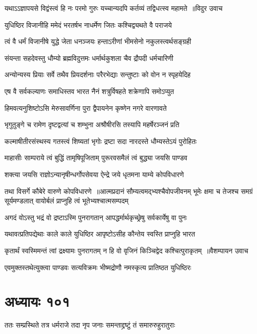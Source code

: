 \twolineshloka
{यथाऽऽज्ञापयसे विद्वंस्त्वं हि नः परमो गुरुः}
{यच्चान्यदपि कर्तव्यं तद्विधत्स्व महामते ॥विदुर उवाच}


\twolineshloka
{युधिष्ठिर विजानीहि ममेदं भरतर्षभ}
{नाधर्मेण जितः कश्चिद्व्यथते वै पराजये}


\twolineshloka
{त्वं वै धर्मं विजानीषे युद्धे जेता धनञ्जयः}
{हन्ताऽरीणां भीमसेनो नकुलस्त्वर्थसङ्ग्रही}


\twolineshloka
{संयन्ता सहदेवस्तु धौम्यो ब्रह्मविदुत्तमः}
{धर्मार्थकुशला चैव द्रौपदी धर्मचारिणी}


\twolineshloka
{अन्योन्यस्य प्रियाः सर्वे तथैव प्रियदर्शनाः}
{परैरभेद्याः सन्तुष्टाः को वोन न स्पृहयेदिह}


\twolineshloka
{एष वै सर्वकल्याणः समाधिस्तव भारत}
{नैनं शत्रुर्विषहते शक्रेणापि समोऽप्युत}


\twolineshloka
{हिमवत्यनुशिष्टोऽसि मेरुसावर्णिना पुरा}
{द्वैपायनेन कृष्णेन नगरे वारणावते}


\twolineshloka
{भृगुतुङ्गे च रामेण दृष्टद्वत्यां च शम्भुना}
{अश्रौषीरसि तस्यापि महर्षेरञ्जनं प्रति}


\twolineshloka
{कल्माषीतीरसंस्थस्य गतस्त्वं शिष्यतां भृगोः}
{द्रष्टा सदा नारदस्ते धौम्यस्तेऽयं पुरोहितः}


\twolineshloka
{माहासीः साम्पराये त्वं बुद्धिं तामृषिपूजिताम्}
{पुरूरवसमैलं त्वं बुद्ध्या जयसि पाण्डव}


\twolineshloka
{शक्त्या जयसि राज्ञोऽन्यानृषीन्धर्गोपसेवया}
{ऐन्द्रे जये धृतमना याम्ये कोपविधारणे}


तथा विसर्गे कौबेरे वारुणे कोपविधारणे ॥आत्मप्रदानं सौम्यत्वमद्भ्यश्चैवोपजीवनम्
\twolineshloka
{भूमेः क्षमा च तेजश्च समग्रं सूर्यमण्डलात्}
{वायोर्बलं प्राप्नुहि त्वं भूतेभ्यश्चात्मसम्पदम्}


\twolineshloka
{अगदं वोऽस्तु भद्रं वो द्रष्टाऽस्मि पुनरागतान्}
{आपद्धर्मार्थकृच्छ्रेषु सर्वकार्येषु वा पुनः}


\twolineshloka
{यथावत्प्रतिपद्येथाः काले काले युधिष्ठिर}
{आपृष्टोऽसीह कौन्तेय स्वस्ति प्राप्नुहि भारत}


\twolineshloka
{कृतार्थं स्वस्मिमन्तं त्वां द्रक्ष्यामः पुनरागतम्}
{न हि वो वृजिनं किञ्चिद्वेद कश्चित्पुराकृतम् ॥वैशम्पायन उवाच}


\twolineshloka
{एवमुक्तस्तथेत्युक्त्वा पाण्डवः सत्यविक्रमः}
{भीष्मद्रोणौ नमस्कृत्य प्रातिष्ठत युधिष्ठिरः}


\chapter{अध्यायः १०१}
\twolineshloka
{ततः सम्प्रस्थिते तत्र धर्मराजे तदा नृप}
{जनाः समन्ताद्द्रष्टुं तं समारुरुहुरातुराः}


